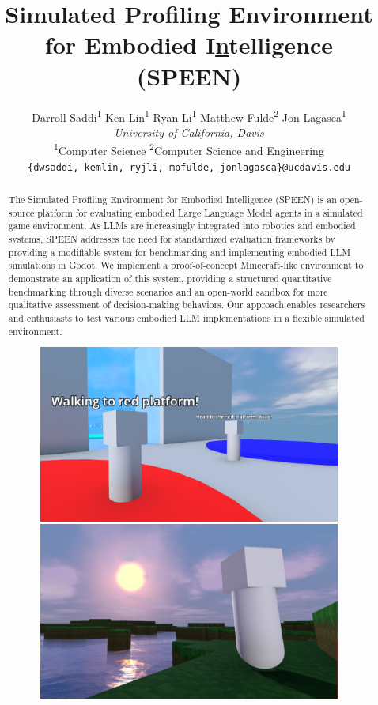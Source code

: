 \documentclass{article}
\title{Simulated Profiling Environment for Embodied I\underline{n}telligence (SPEEN)}
\author{%
    Darroll Saddi\textsuperscript{1} \quad
        Ken Lin\textsuperscript{1} \quad
        Ryan Li\textsuperscript{1} \quad
        Matthew Fulde\textsuperscript{2} \quad
        Jon Lagasca\textsuperscript{1} \vspace{0.75em} \\
        \large{\textit{University of California, Davis}} \\
        \vspace{0.5em}
        \textsuperscript{1}Computer Science \quad
        \textsuperscript{2}Computer Science and Engineering \\
        \texttt{\{dwsaddi, kemlin, ryjli, mpfulde, jonlagasca\}@ucdavis.edu}
    }
\begin{document}
\maketitle

\begin{abstract}
    The Simulated Profiling Environment for Embodied Intelligence (SPEEN) is an open-source platform for evaluating embodied Large Language Model agents in a simulated game environment.
    As LLMs are increasingly integrated into robotics and embodied systems, SPEEN addresses the need for standardized evaluation frameworks by providing a modifiable system for benchmarking and implementing embodied LLM simulations in Godot.
    We implement a proof-of-concept Minecraft-like environment to demonstrate an application of this system, providing a structured quantitative benchmarking through diverse scenarios and an open-world sandbox for more qualitative assessment of decision-making behaviors.
    Our approach enables researchers and enthusiasts to test various embodied LLM implementations in a flexible simulated environment.
    \begin{figure}[ht!]
        \centering
        \begin{minipage}[b]{0.49\textwidth}
            \centering
            \includegraphics[width=\textwidth]{./example.png}
        \end{minipage}
        \hfill
        \begin{minipage}[b]{0.49\textwidth}
            \centering
            \includegraphics[width=\textwidth]{./example2.png}

\end{minipage}
\end{figure}
\end{abstract}
\end{document}
